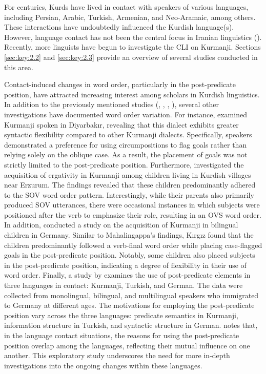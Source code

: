 For centuries, Kurds have lived in contact with speakers of various languages, including Persian, Arabic, Turkish, Armenian, and Neo-Aramaic, among others. These interactions have undoubtedly influenced the Kurdish language(s). However, language contact has not been the central focus in Iranian linguistics (\citealt{HaigMatras2002}). Recently, more linguists have begun to investigate the CLI on Kurmanji. Sections \ref{sec:key:2.2} and \ref{sec:key:2.3} provide an overview of several studies conducted in this area.

Contact-induced changes in word order, particularly in the post-predicate position, have attracted increasing interest among scholars in Kurdish linguistics. In addition to the previously mentioned studies (\citealt{Haig2014}, \citealt{Haig2018}, \citealt{Gundogdu2019} \citealt{Haig2022}, \citealt{Asadpour2021}), several other investigations have documented word order variation. For instance, \citet{Dorleijn1996} examined Kurmanji spoken in Diyarbakır, revealing that this dialect exhibits greater syntactic flexibility compared to other Kurmanji dialects. Specifically, speakers demonstrated a preference for using circumpositions to flag goals rather than relying solely on the oblique case. As a result, the placement of goals was not strictly limited to the post-predicate position. Furthermore, \citet{Mahalingappa2009} investigated the acquisition of ergativity in Kurmanji among children living in Kurdish villages near Erzurum. The findings revealed that these children predominantly adhered to the SOV word order pattern. Interestingly, while their parents also primarily produced SOV utterances, there were occasional instances in which subjects were positioned after the verb to emphasize their role, resulting in an OVS word order. In addition, \citet{Kirgiz2022} conducted a study on the acquisition of Kurmanji in bilingual children in Germany. Similar to Mahalingappa's findings, Kırgız found that the children predominantly followed a verb-final word order while placing case-flagged goals in the post-predicate position. Notably, some children also placed subjects in the post-predicate position, indicating a degree of flexibility in their use of word order. Finally, a study by \citet{Herkenrath2021} examines the use of post-predicate elements in three languages in contact: Kurmanji, Turkish, and German. The data were collected from monolingual, bilingual, and multilingual speakers who immigrated to Germany at different ages. The motivations for employing the post-predicate position vary across the three languages: predicate semantics in Kurmanji, information structure in Turkish, and syntactic structure in German. \citet{Herkenrath2021} notes that, in the language contact situations, the reasons for using the post-predicate position overlap among the languages, reflecting their mutual influence on one another. This exploratory study underscores the need for more in-depth investigations into the ongoing changes within these languages.

